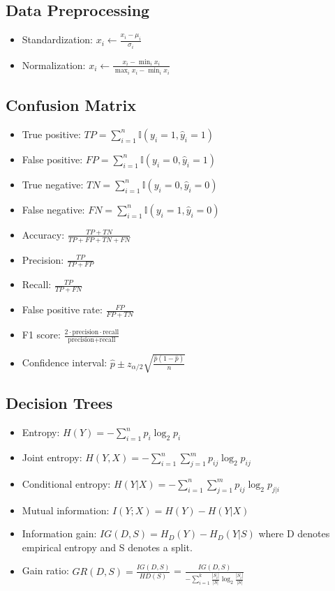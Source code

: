 \documentclass[a4paper,7pt]{extarticle}
\theoremstyle{definition}
\begin{document}
\begin{multicols*}{2}
\subsection{Data Preprocessing}

\begin{itemize}
\item Standardization: $x_i \leftarrow \frac{x_i - \mu_i}{\sigma_i}$
\item Normalization: $x_i \leftarrow \frac{x_i - \min_i x_i}{\max_i x_i - \min_i x_i}$
\end{itemize}

\subsection{Confusion Matrix}

\begin{itemize}
\item True positive: $TP = \sum_{i=1}^n \mathbb{I}(y_i = 1, \hat{y}_i = 1)$
\item False positive: $FP = \sum_{i=1}^n \mathbb{I}(y_i = 0, \hat{y}_i = 1)$
\item True negative: $TN = \sum_{i=1}^n \mathbb{I}(y_i = 0, \hat{y}_i = 0)$
\item False negative: $FN = \sum_{i=1}^n \mathbb{I}(y_i = 1, \hat{y}_i = 0)$
\item Accuracy: $\frac{TP + TN}{TP + FP + TN + FN}$
\item Precision: $\frac{TP}{TP + FP}$
\item Recall: $\frac{TP}{TP + FN}$
\item False   positive rate: $\frac{FP}{FP + TN}$
\item F1 score: $\frac{2 \cdot \text{precision} \cdot \text{recall}}{\text{precision} + \text{recall}}$
\item Confidence  interval: $\hat{p} \pm z_{\alpha/2} \sqrt{\frac{\hat{p} (1 - \hat{p})}{n}}$
\end{itemize}

\subsection{Decision Trees}

\begin{itemize}
\item Entropy: $H(Y) = - \sum_{i=1}^n p_i \log_2 p_i$
\item Joint entropy: $H(Y, X) = - \sum_{i=1}^n \sum_{j=1}^m p_{ij} \log_2 p_{ij}$
\item Conditional entropy: $H(Y|X) = - \sum_{i=1}^n \sum_{j=1}^m p_{ij} \log_2 p_{j|i}$
\item Mutual information: $I(Y; X) = H(Y) - H(Y|X)$
\item Information gain: $IG(D,S) = H_D(Y) - H_D(Y|S)$ where D denotes empirical entropy and S denotes a split.
\item Gain ratio: $GR(D,S) = \frac{IG(D,S)}{HD(S)}$ = $\frac{IG(D,S)}{-\sum_{i=1}^k \frac{|S_i|}{|S|} \log_2 \frac{|S_i|}{|S|}}$
\end{itemize}


\end{multicols*}
\end{document}
